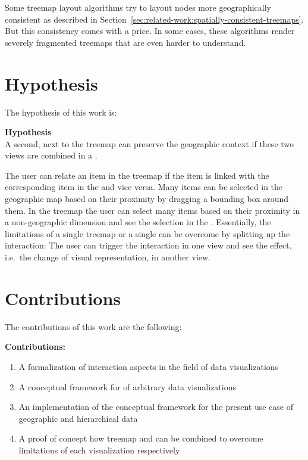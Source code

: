 Some treemap layout algorithms try to layout nodes more geographically consistent as described in Section~\ref{sec:related-work:spatially-consistent-treemaps}.
But this consistency comes with a price.
In some cases, these algorithms render severely fragmented treemaps that are even harder to understand.


\section{Hypothesis}\label{sec:introduction:hypothesis}
The hypothesis of this work is:
\begin{tcolorbox}
\textbf{Hypothesis} \\
A second, \gv{} next to the treemap can preserve the geographic context if these two views are combined in a \cmv{}.
\end{tcolorbox}

The user can relate an item in the treemap if the item is linked with the corresponding item in the \gv{} and vice versa.
Many items can be selected in the geographic map based on their proximity by dragging a bounding box around them.
In the treemap the user can select many items based on their proximity in a non-geographic dimension and see the selection in the \gv{}.
Essentially,  the limitations of a single treemap or a single \gv{} can be overcome by splitting up the interaction:
The user can trigger the interaction in one view and see the effect, i.e.\ the change of visual representation, in another view.


\section{Contributions}


\begin{minipage}{\textwidth}
	The contributions of this work are the following: \\
	\begin{tcolorbox}
		\textbf{Contributions:}
		\begin{enumerate}
  \item A formalization of interaction aspects in the field of data visualizations
  \item A conceptual framework for \cmvs{} of arbitrary data visualizations
  \item An implementation of the conceptual framework for the present use case of geographic and hierarchical data
  \item A proof of concept how treemap and \gv{} can be combined to overcome limitations of each visualization respectively
		\end{enumerate}
	\end{tcolorbox}
\end{minipage} \\



